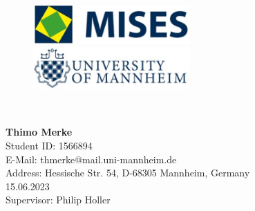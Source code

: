 \begin{titlepage}
\newcommand{\HRule}{\rule{\linewidth}{0.5mm}} %

\center %
\begin{figure}
  \centering
  \begin{minipage}[b]{0.4\textwidth}
    \includegraphics[width=6cm]{figures/mises.jpg}
  \end{minipage}
  \hfill
  \begin{minipage}[b]{0.4\textwidth}
    \includegraphics[width=6cm]{figures/uoma.jpg}
  \end{minipage}
\end{figure}
\vspace*{6\baselineskip}

\makeatletter
{\large \bfseries \@title}\\[0.4cm] %
\vspace*{4\baselineskip}
\begin{center} %
\textbf{Thimo Merke}\\  %
Student ID: 1566894\\
E-Mail: thmerke@mail.uni-mannheim.de\\
Address: Hessische Str. 54, D-68305 Mannheim, Germany\\
\vspace*{4\baselineskip} 
15.06.2023 \\
Supervisor: Philip Holler
\end{center}

\makeatother
\vfill %
\end{titlepage}